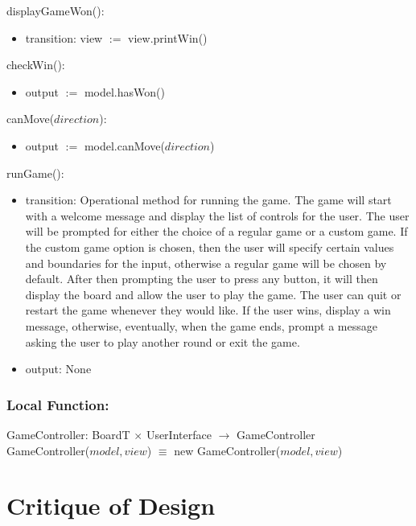 \documentclass[12pt]{article}
\begin{document}
\noindent displayGameWon():
\begin{itemize}
  \item transition: view $:=$ view.printWin()
\end{itemize}

\noindent checkWin():
\begin{itemize}
  \item output $:=$ model.hasWon()
\end{itemize}

\noindent canMove($direction$):
\begin{itemize}
  \item output $:=$ model.canMove($direction$)
\end{itemize}

\noindent runGame():
\begin{itemize}
  \item transition: Operational method for running the game. The game will start with a welcome message and display the list of controls for the user. The user will be prompted for either the choice of a regular game or a custom game. If the custom game option is chosen, then the user will specify certain values and boundaries for the input, otherwise a regular game will be chosen by default. After then prompting the user to press any button, it will then display the board and allow the user to play the game. The user can quit or restart the game whenever they would like. If the user wins, display a win message, otherwise, eventually, when the game ends, prompt a message asking the user to play another round or exit the game.
  \item output: None
\end{itemize}

\subsubsection*{Local Function:}

GameController: BoardT $\times$ UserInterface $\rightarrow$ GameController \\
GameController($model, view$) $\equiv$ new GameController($model, view$)

\newpage

\section*{Critique of Design}
\end{document}
